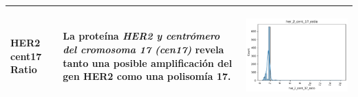 \begin{table}[!htb]
\begin{threeparttable}
\begin{tabular}{p{2.5cm} p{7cm} p{6.5cm}}
			HER2 cent17 Ratio
			& La proteína \textit{HER2 y centrómero del cromosoma 17 (cen17)} revela tanto una posible amplificación del gen HER2 como una polisomía 17.
			& \begin{center}\includegraphics[width=1\linewidth]{NOTEBOOK/IMAGENES_DESCRIPTIVAS/18_her_2_cent_17_ratio}\end{center}
			\\ \hline
		\end{tabular}
	\end{threeparttable}
\end{table}










